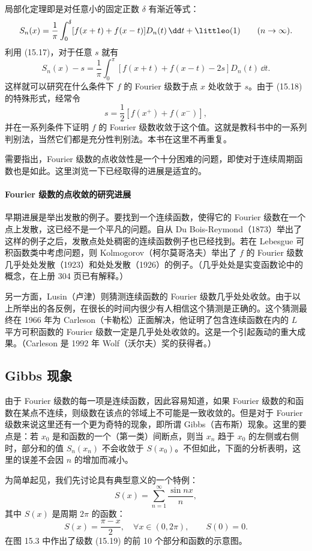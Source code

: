 局部化定理即是对任意小的固定正数 $\delta$ 有渐近等式：
\[
  S_n(x)=\frac1\pi\int_0^{\delta}[f(x+t)+f(x-t)]D_n(t)\,\dd t+\littleo(1)\qquad(n\to\infty).
\]
利用 (15.17)，对于任意 $s$ 就有
\begin{equation}
  S_n(x)-s=\frac1\pi\int_0^{\pi}[f(x+t)+f(x-t)-2s]D_n(t)\,\dd t.
  \tag{15.18}
  \label{eq:15.18}
\end{equation}
这样就可以研究在什么条件下 $f$ 的 Fourier 级数于点 $x$ 处收敛于 $s$。由于 (15.18) 的特殊形式，经常令
\[
  s=\frac12[f(x^+)+f(x^-)],
\]
并在一系列条件下证明 $f$ 的 Fourier 级数收敛于这个值。这就是教科书中的一系列判别法，当然它们都是充分性判别法。本书在这里不再重复。

需要指出，Fourier 级数的点收敛性是一个十分困难的问题，即使对于连续周期函数也是如此。这里浏览一下已经取得的进展是适宜的。

\paragraph{Fourier 级数的点收敛的研究进展}
早期进展是举出发散的例子。要找到一个连续函数，使得它的 Fourier 级数在一个点上发散，这已经不是一个平凡的问题。自从 Du Bois-Reymond（1873）举出了这样的例子之后，发散点处处稠密的连续函数例子也已经找到。若在 Lebesgue 可积函数类中考虑问题，则 Kolmogorov（柯尔莫哥洛夫）举出了 $f$ 的 Fourier 级数几乎处处发散（1923）和处处发散（1926）的例子。（几乎处处是实变函数论中的概念，在上册 304 页已有解释。）

另一方面，Lusin（卢津）则猜测连续函数的 Fourier 级数几乎处处收敛。由于以上所举出的各反例，在很长的时间内很少有人相信这个猜测是正确的。这个猜测最终在 1966 年为 Carleson（卡勒松）正面解决，他证明了包含连续函数在内的 $L$ 平方可积函数的 Fourier 级数一定是几乎处处收敛的。这是一个引起轰动的重大成果。（Carleson 是 1992 年 Wolf（沃尔夫）奖的获得者。）

\subsection{Gibbs 现象}

由于 Fourier 级数的每一项是连续函数，因此容易知道，如果 Fourier 级数的和函数在某点不连续，则级数在该点的邻域上不可能是一致收敛的。但是对于 Fourier 级数来说这里还有一个更为奇特的现象，即所谓 Gibbs（吉布斯）现象。这里的要点是：若 $x_0$ 是和函数的一个（第一类）间断点，则当 $x_n$ 趋于 $x_0$ 的左侧或右侧时，部分和的值 $S_n(x_n)$ 不会收敛于 $S(x_0)$。不但如此，下面的分析表明，这里的误差不会因 $n$ 的增加而减小。

为简单起见，我们先讨论具有典型意义的一个特例：
\begin{equation}
  S(x)=\sum_{n=1}^{\infty}\frac{\sin nx}{n},
  \tag{15.19}
  \label{eq:15.19}
\end{equation}
其中 $S(x)$ 是周期 $2\pi$ 的函数：
\[
  S(x)=\frac{\pi-x}{2},\quad \forall x\in(0,2\pi),\qquad S(0)=0.
\]
在图 15.3 中作出了级数 (15.19) 的前 10 个部分和函数的示意图。

